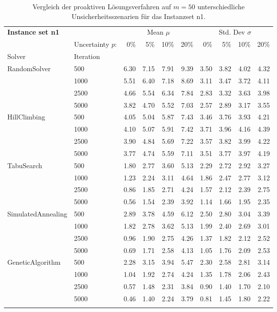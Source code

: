 {\footnotesize
\begin{longtable}{ll|rrrr|rrrr}
\toprule
\textbf{Instance set n1}                 & {} & \multicolumn{4}{c|}{Mean $\mu$} & \multicolumn{4}{c}{Std. Dev $\sigma$} \\
                & Uncertainty $p$: & 0\% & 5\% & 10\% & 20\% & 0\% & 5\% & 10\% & 20\% \\
Solver & Iteration &      &      &      &      &      &      &      &      \\
\midrule
RandomSolver & 500  & 6.30 & 7.15 & 7.91 & 9.39 & 3.50 & 3.82 & 4.02 & 4.32 \\
                 & 1000 & 5.51 & 6.40 & 7.18 & 8.69 & 3.11 & 3.47 & 3.72 & 4.11 \\
                 & 2500 & 4.66 & 5.54 & 6.34 & 7.84 & 2.83 & 3.32 & 3.63 & 3.98 \\
                 & 5000 & 3.82 & 4.70 & 5.52 & 7.03 & 2.57 & 2.89 & 3.17 & 3.55 \\ \hline
HillClimbing & 500  & 4.05 & 5.04 & 5.87 & 7.43 & 3.46 & 3.76 & 3.93 & 4.21 \\
                 & 1000 & 4.10 & 5.07 & 5.91 & 7.42 & 3.71 & 3.96 & 4.16 & 4.39 \\
                 & 2500 & 3.90 & 4.84 & 5.69 & 7.22 & 3.57 & 3.82 & 3.99 & 4.22 \\
                 & 5000 & 3.77 & 4.74 & 5.59 & 7.11 & 3.51 & 3.77 & 3.97 & 4.19 \\ \hline
TabuSearch & 500  & 1.80 & 2.77 & 3.60 & 5.13 & 2.29 & 2.72 & 2.92 & 3.27 \\
                 & 1000 & 1.23 & 2.24 & 3.11 & 4.64 & 1.86 & 2.47 & 2.77 & 3.12 \\
                 & 2500 & 0.86 & 1.85 & 2.71 & 4.24 & 1.57 & 2.12 & 2.39 & 2.75 \\
                 & 5000 & 0.56 & 1.54 & 2.39 & 3.92 & 1.14 & 1.66 & 1.95 & 2.35 \\ \hline
SimulatedAnnealing & 500  & 2.89 & 3.78 & 4.59 & 6.12 & 2.50 & 2.80 & 3.04 & 3.39 \\
                 & 1000 & 1.82 & 2.78 & 3.62 & 5.13 & 1.99 & 2.40 & 2.69 & 3.01 \\
                 & 2500 & 0.96 & 1.90 & 2.75 & 4.26 & 1.37 & 1.82 & 2.12 & 2.52 \\
                 & 5000 & 0.69 & 1.71 & 2.58 & 4.13 & 1.05 & 1.76 & 2.09 & 2.53 \\ \hline
GeneticAlgorithm & 500  & 2.28 & 3.15 & 3.94 & 5.47 & 2.30 & 2.58 & 2.81 & 3.14 \\
                 & 1000 & 1.04 & 1.92 & 2.74 & 4.24 & 1.35 & 1.78 & 2.06 & 2.43 \\
                 & 2500 & 0.57 & 1.48 & 2.31 & 3.84 & 0.90 & 1.40 & 1.70 & 2.10 \\
                 & 5000 & 0.46 & 1.40 & 2.24 & 3.79 & 0.81 & 1.45 & 1.80 & 2.22 \\
\bottomrule
\caption{Vergleich der proaktiven Lösungsverfahren auf $m=50$ unterschiedliche Unsicherheitsszenarien für das Instanzset n1. }
\label{tab:evaluation_proactive_n1}
\end{longtable}
}

